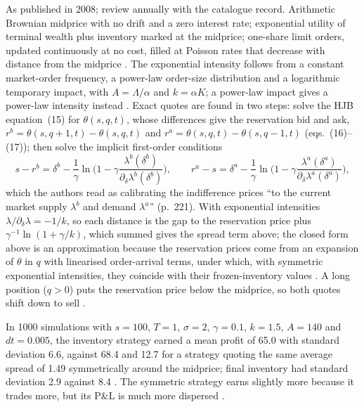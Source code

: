 \begin{qfmodel}
 As published in 2008; review annually with the catalogue record. Arithmetic Brownian midprice with no drift and a zero interest rate; exponential utility of terminal wealth plus inventory marked at the midprice; one-share limit orders, updated continuously at no cost, filled at Poisson rates that decrease with distance from the midprice \citep[secs.~2.1--2.4, pp.~218--219]{s6-stoikov}. The exponential intensity follows from a constant market-order frequency, a power-law order-size distribution and a logarithmic temporary impact, with $A=\Lambda/\alpha$ and $k=\alpha K$; a power-law impact gives a power-law intensity instead \citep[sec.~2.5, eq.~(12), p.~220]{s6-stoikov}. Exact quotes are found in two steps: solve the HJB equation~(15) for $\theta(s,q,t)$, whose differences give the reservation bid and ask, $r^b=\theta(s,q+1,t)-\theta(s,q,t)$ and $r^a=\theta(s,q,t)-\theta(s,q-1,t)$ (eqs.~(16)--(17)); then solve the implicit first-order conditions \citep[sec.~3.1, eqs.~(15)--(19), pp.~220--221]{s6-stoikov}
\[ s-r^b=\delta^b-\frac1\gamma\ln\Big(1-\gamma\frac{\lambda^b(\delta^b)}{\partial_\delta\lambda^b(\delta^b)}\Big),\qquad r^a-s=\delta^a-\frac1\gamma\ln\Big(1-\gamma\frac{\lambda^a(\delta^a)}{\partial_\delta\lambda^a(\delta^a)}\Big), \]
which the authors read as calibrating the indifference prices ``to the current market supply $\lambda^b$ and demand $\lambda^a$'' (p.~221). With exponential intensities $\lambda/\partial_\delta\lambda=-1/k$, so each distance is the gap to the reservation price plus $\gamma^{-1}\ln(1+\gamma/k)$, which summed gives the spread term above; the closed form above is an approximation because the reservation prices come from an expansion of $\theta$ in $q$ with linearised order-arrival terms, under which, with symmetric exponential intensities, they coincide with their frozen-inventory values \citep[sec.~3.2, p.~221]{s6-stoikov}. A long position ($q>0$) puts the reservation price below the midprice, so both quotes shift down to sell \citep[sec.~2.2, p.~219]{s6-stoikov}.

 In 1000 simulations with $s=100$, $T=1$, $\sigma=2$, $\gamma=0.1$, $k=1.5$, $A=140$ and $dt=0.005$, the inventory strategy earned a mean profit of 65.0 with standard deviation 6.6, against 68.4 and 12.7 for a strategy quoting the same average spread of 1.49 symmetrically around the midprice; final inventory had standard deviation 2.9 against 8.4 \citep[sec.~3.3, Table~1, p.~222]{s6-stoikov}. The symmetric strategy earns slightly more because it trades more, but its P\&L is much more dispersed \citep[sec.~3.3, p.~222]{s6-stoikov}.


\end{qfmodel}

